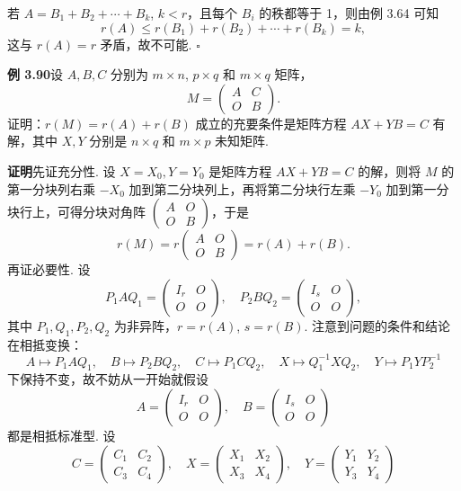 \documentclass[UTF8,12pt,a4paper,fontset=fandol]{ctexart}
\begin{document}
若 $A=B_1+B_2+\cdots+B_k$, $k<r$，且每个 $B_i$ 的秩都等于 1，则由例 3.64 可知
\[
r(A)\le r(B_1)+r(B_2)+\cdots+r(B_k)=k,
\]
这与 $r(A)=r$ 矛盾，故不可能. $\square$

\noindent\textbf{例 3.90}\quad 设 $A,B,C$ 分别为 $m\times n$, $p\times q$ 和 $m\times q$ 矩阵，
\[
M=\begin{pmatrix}A&C\\O&B\end{pmatrix}.
\]
证明：$r(M)=r(A)+r(B)$ 成立的充要条件是矩阵方程 $AX+YB=C$ 有解，其中 $X,Y$ 分别是 $n\times q$ 和 $m\times p$ 未知矩阵.

\noindent\textbf{证明}\quad 先证充分性. 设 $X=X_0,Y=Y_0$ 是矩阵方程 $AX+YB=C$ 的解，则将 $M$ 的第一分块列右乘 $-X_0$ 加到第二分块列上，再将第二分块行左乘 $-Y_0$ 加到第一分块行上，可得分块对角阵 $\begin{pmatrix}A&O\\O&B\end{pmatrix}$，于是
\[
r(M)=r\begin{pmatrix}A&O\\O&B\end{pmatrix}=r(A)+r(B).
\]
再证必要性. 设
\[
P_1AQ_1=\begin{pmatrix}I_r&O\\O&O\end{pmatrix},\quad
P_2BQ_2=\begin{pmatrix}I_s&O\\O&O\end{pmatrix},
\]
其中 $P_1,Q_1,P_2,Q_2$ 为非异阵，$r=r(A)$, $s=r(B)$. 注意到问题的条件和结论在相抵变换：
\[
A\mapsto P_1AQ_1,\quad B\mapsto P_2BQ_2,\quad C\mapsto P_1CQ_2,\quad
X\mapsto Q_1^{-1}XQ_2,\quad Y\mapsto P_1YP_2^{-1}
\]
下保持不变，故不妨从一开始就假设
\[
A=\begin{pmatrix}I_r&O\\O&O\end{pmatrix},\quad
B=\begin{pmatrix}I_s&O\\O&O\end{pmatrix}
\]
都是相抵标准型. 设
\[
C=\begin{pmatrix}C_1&C_2\\C_3&C_4\end{pmatrix},\quad
X=\begin{pmatrix}X_1&X_2\\X_3&X_4\end{pmatrix},\quad
Y=\begin{pmatrix}Y_1&Y_2\\Y_3&Y_4\end{pmatrix}
\]
\end{document}
